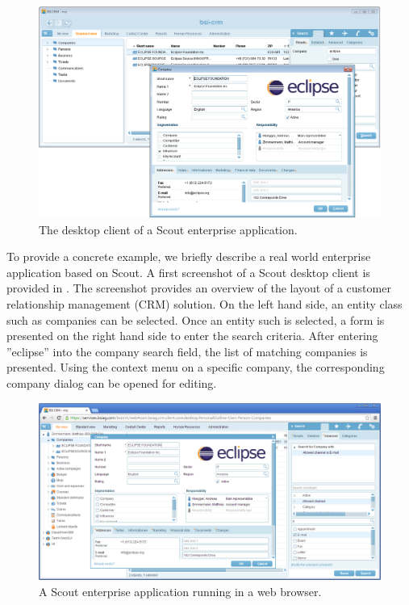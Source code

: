 \documentclass[a4paper,10pt,twoside]{book}
\begin{document}
\begin{figure}
\includegraphics[width=14cm]{bsi_crm_desktop.png}
\caption{The desktop client of a Scout enterprise application.}
\end{figure}

To provide a concrete example, we briefly describe a real world enterprise application based on Scout. 
A first screenshot of a Scout desktop client is provided in . 
The screenshot provides an overview of the layout of a customer relationship management (CRM) solution. 
On the left hand side, an entity class such as companies can be selected. 
Once an entity such is selected, a form is presented on the right hand side to enter the search criteria.
After entering ''eclipse'' into the company search field, the list of matching companies is presented.
Using the context menu on a specific company, the corresponding company dialog can be opened for editing.

\begin{figure}
\includegraphics[width=14cm]{bsi_crm_web.png}
\caption{A Scout enterprise application running in a web browser.}
\end{figure}
\end{document}
